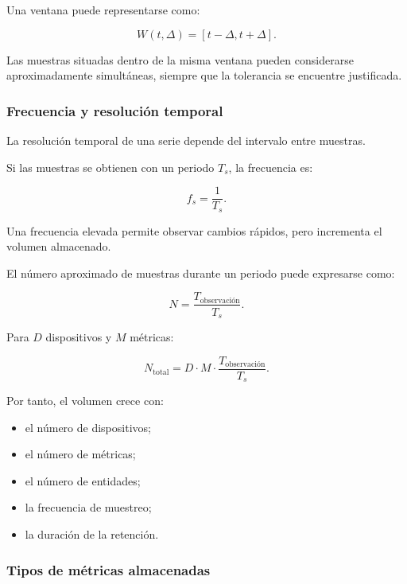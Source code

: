 Una ventana puede representarse como:

\[
    W(t,\Delta)
    =
    [
        t-\Delta,
        t+\Delta
    ].
\]

Las muestras situadas dentro de la misma ventana pueden considerarse
aproximadamente simultáneas, siempre que la tolerancia se encuentre
justificada.


\subsubsection*{Frecuencia y resolución temporal}

La resolución temporal de una serie depende del intervalo entre
muestras.

Si las muestras se obtienen con un periodo \(T_s\), la frecuencia es:

\[
    f_s
    =
    \frac{1}{T_s}.
\]

Una frecuencia elevada permite observar cambios rápidos, pero incrementa
el volumen almacenado.

El número aproximado de muestras durante un periodo puede expresarse
como:

\[
    N
    =
    \frac{
        T_{\mathrm{observación}}
    }{
        T_s
    }.
\]

Para \(D\) dispositivos y \(M\) métricas:

\[
    N_{\mathrm{total}}
    =
    D
    \cdot
    M
    \cdot
    \frac{
        T_{\mathrm{observación}}
    }{
        T_s
    }.
\]

Por tanto, el volumen crece con:

\begin{itemize}
    \item el número de dispositivos;

    \item el número de métricas;

    \item el número de entidades;

    \item la frecuencia de muestreo;

    \item la duración de la retención.
\end{itemize}


\subsubsection*{Tipos de métricas almacenadas}

